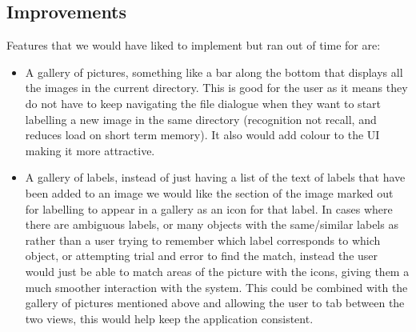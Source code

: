 \documentclass[a4paper,11pt,oneside]{article}
\begin{document}
\subsection{Improvements}
Features that we would have liked to implement but ran out of time for are:
\begin{itemize}
\item A gallery of pictures, something like a bar along the bottom that displays all the images in the current directory.  This is good for the user as it means they do not have to keep navigating the file dialogue when they want to start labelling a new image in the same directory (recognition not recall, and reduces load on short term memory).  It also would add colour to the UI making it more attractive.
\item A gallery of labels, instead of just having a list of the text of labels that have been added to an image we would like the section of the image marked out for labelling to appear in a gallery as an icon for that label.  In cases where there are ambiguous labels, or many objects with the same/similar labels as rather than a user trying to remember which label corresponds to which object, or attempting trial and error to find the match, instead the user would just be able to match areas of the picture with the icons, giving them a much smoother interaction with the system.  This could be combined with the gallery of pictures mentioned above and allowing the user to tab between the two views, this would help keep the application consistent.
\end{itemize}
\end{document}

